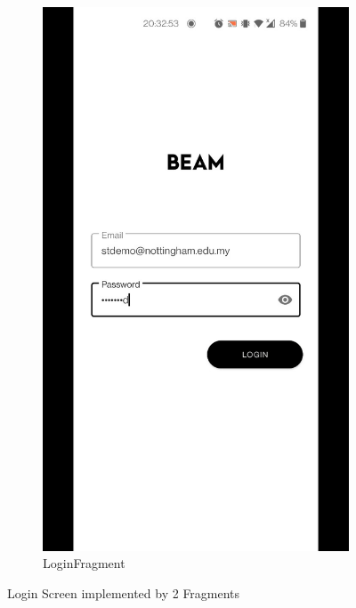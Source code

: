 \documentclass[../report.tex]{subfiles}
\begin{document}
\begin{figure} [H]
	\hspace{0.1\textwidth}
	\begin{subfigure}[b]{0.28\textwidth}
		\centering
		\includegraphics[width=\textwidth]{../images/07/02-app-login.jpg}
		\caption{LoginFragment}
		\label{fig:app-login-frag}
	\end{subfigure}
	\caption{Login Screen implemented by 2 Fragments}
	\label{fig:app-login-screen}
\end{figure}
\end{document}
